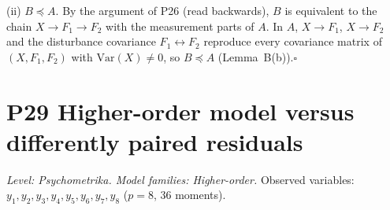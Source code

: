 \documentclass[10pt,a4paper]{article}
\newcommand{\nest}{\preceq}
\begin{document}
\noindent(ii) $B\nest A$. By the argument of P26 (read backwards), $B$ is equivalent to the chain $X\to F_1\to F_2$ with the measurement parts of $A$. In $A$, $X\to F_1$, $X\to F_2$ and the disturbance covariance $F_1\leftrightarrow F_2$ reproduce every covariance matrix of $(X,F_1,F_2)$ with $\mathrm{Var}(X)\neq0$, so $B\nest A$ (Lemma~B(b)).\hfill$\square$\par\medskip
{}

\clearpage
\section*{P29 \quad Higher-order model versus differently paired residuals}
\noindent\textit{Level: Psychometrika. Model families: Higher-order.} Observed variables: $y_{1}, y_{2}, y_{3}, y_{4}, y_{5}, y_{6}, y_{7}, y_{8}$ ($p=8$, 36 moments).\par\medskip
\end{document}
